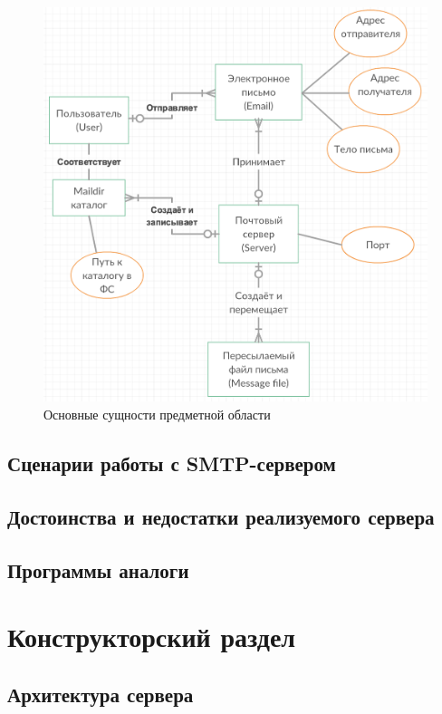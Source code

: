 \documentclass[a4paper,12pt]{report}
\begin{document}
\begin{figure}
\centering
\includegraphics[width=\textwidth]{diagramms/entities.png}
\caption{Основные сущности предметной области}
\label{fig:entities}
\end{figure}


\section{Сценарии работы с SMTP-сервером}

\section{Достоинства и недостатки реализуемого сервера}

\section{Программы аналоги}


\chapter{Конструкторский раздел}

\section{Архитектура сервера}
\end{document}
